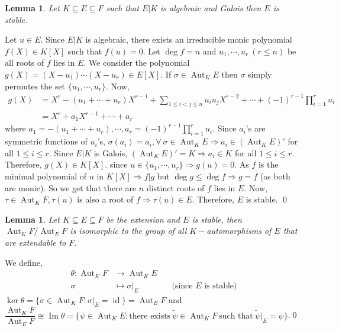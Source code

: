 \documentclass[11pt]{amsart}
\newtheorem{lemma}[theorem]{Lemma}%
\DeclareMathOperator{\im}{\text{Im}}
\DeclareMathOperator{\aut}{\text{Aut}}
\DeclareMathOperator{\id}{\text{id}}
\begin{document}
\begin{lemma}
Let $K\subseteq E\subseteq F$ such that $E|K$ is algebraic and Galois then $E$ is stable.
\end{lemma}
\proof Let $u\in E$. Since $E|K$ is algebraic, there exists an irreducible monic polynomial $f(X)\in K[X]$ such that $f(u)=0.$ Let $\deg f=n$ and $u_1,\cdots,u_r~(r\leq n)$ be all roots of $f$ lies in $E$. We consider the polynomial $g(X)=(X-u_1)\cdots(X-u_r)\in E[X].$ If $\sigma\in\aut_KE$ then $\sigma$ simply permutes the set $\{u_1,\cdots,u_r\}$. Now, \begin{align*}
g(X)&=X^r-(u_1+\cdots+u_r)X^{r-1}+\displaystyle\sum_{1\leq i<j\leq n}u_iu_jX^{r-2}+\cdots+(-1)^{r-1}\displaystyle\prod_{i=1}^r u_i\\
&=X^r+a_1X^{r-1}+\cdots+a_r
\end{align*}
where $a_1=-(u_1+\cdots+u_r),\cdots,a_r=(-1)^{r-1}\displaystyle\prod_{i=1}^ru_i.$ Since $a_i$'s are symmetric functions of $u_i$'s, $\sigma(a_i)=a_i,\forall~\sigma\in\aut_KE \Rightarrow a_i\in (\aut_KE)'$ for all $1\leq i\leq r.$ Since $E|K$ is Galois, $(\aut_KE)'=K \Rightarrow a_i\in K$ for all $1\leq i\leq r.$ Therefore, $g(X)\in K[X].$ since $u\in\{u_1,\cdots,u_r\}\Rightarrow g(u)=0$. As $f$ is the minimal polynomial of $u$ in $K[X] \Rightarrow f|g$ but $\deg g\leq \deg f \Rightarrow g=f$ (as both are monic). So we get that there are $n$ distinct roots of $f$ lies in $E.$ Now, $\tau\in\aut_KF,\tau(u)$ is also a root of $f \Rightarrow \tau(u)\in E.$ Therefore, $E$ is stable. \qed

\begin{lemma}
Let $K\subseteq E\subseteq F$ be the extension and $E$ is stable, then $\aut_KF/\aut_EF$ is isomorphic to the group of all $K-$automorphisms of $E$ that are extendable to $F.$
\end{lemma}
\proof We define, \begin{align*}
\theta:\aut_KF&\to \aut_KE\\
\sigma&\mapsto \sigma|_E\qquad\qquad\text{(since $E$ is stable)}
\end{align*}
$\ker\theta=\{\sigma\in\aut_KF:\sigma|_E=\id\}=\aut_EF$ and $\dfrac{\aut_KF}{\aut_EF}\cong \im\theta=\{\psi\in\aut_KE:\text{there exists}~\tilde{\psi}\in\aut_KF~\text{such that}~\tilde{\psi}|_E=\psi\}$.\qed
\end{document}

